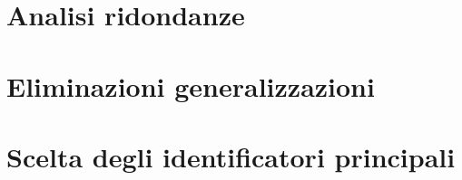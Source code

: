 \section{Analisi ridondanze}
	
	
\section{Eliminazioni generalizzazioni}


\section{Scelta degli identificatori principali}
